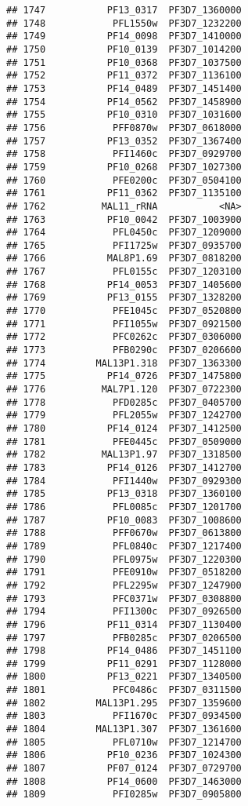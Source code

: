 \documentclass{article}\usepackage[]{graphicx}\usepackage[]{color}
\makeatletter
\newenvironment{kframe}{%
 \def\at@end@of@kframe{}%
 \ifinner\ifhmode%
  \def\at@end@of@kframe{\end{minipage}}%
  \begin{minipage}{\columnwidth}%
 \fi\fi%
 \def\FrameCommand##1{\hskip\@totalleftmargin \hskip-\fboxsep
 \colorbox{shadecolor}{##1}\hskip-\fboxsep
     \hskip-\linewidth \hskip-\@totalleftmargin \hskip\columnwidth}%
 \MakeFramed {\advance\hsize-\width
   \@totalleftmargin\z@ \linewidth\hsize
   \@setminipage}}%
 {\par\unskip\endMakeFramed%
 \at@end@of@kframe}
\newenvironment{knitrout}{}{} %
\makeatother
\begin{document}
\begin{knitrout}
\begin{kframe}
\begin{verbatim}
## 1747           PF13_0317  PF3D7_1360000
## 1748            PFL1550w  PF3D7_1232200
## 1749           PF14_0098  PF3D7_1410000
## 1750           PF10_0139  PF3D7_1014200
## 1751           PF10_0368  PF3D7_1037500
## 1752           PF11_0372  PF3D7_1136100
## 1753           PF14_0489  PF3D7_1451400
## 1754           PF14_0562  PF3D7_1458900
## 1755           PF10_0310  PF3D7_1031600
## 1756            PFF0870w  PF3D7_0618000
## 1757           PF13_0352  PF3D7_1367400
## 1758            PFI1460c  PF3D7_0929700
## 1759           PF10_0268  PF3D7_1027300
## 1760            PFE0200c  PF3D7_0504100
## 1761           PF11_0362  PF3D7_1135100
## 1762          MAL11_rRNA           <NA>
## 1763           PF10_0042  PF3D7_1003900
## 1764            PFL0450c  PF3D7_1209000
## 1765            PFI1725w  PF3D7_0935700
## 1766           MAL8P1.69  PF3D7_0818200
## 1767            PFL0155c  PF3D7_1203100
## 1768           PF14_0053  PF3D7_1405600
## 1769           PF13_0155  PF3D7_1328200
## 1770            PFE1045c  PF3D7_0520800
## 1771            PFI1055w  PF3D7_0921500
## 1772            PFC0262c  PF3D7_0306000
## 1773            PFB0290c  PF3D7_0206600
## 1774         MAL13P1.318  PF3D7_1363300
## 1775           PF14_0726  PF3D7_1475800
## 1776          MAL7P1.120  PF3D7_0722300
## 1778            PFD0285c  PF3D7_0405700
## 1779            PFL2055w  PF3D7_1242700
## 1780           PF14_0124  PF3D7_1412500
## 1781            PFE0445c  PF3D7_0509000
## 1782          MAL13P1.97  PF3D7_1318500
## 1783           PF14_0126  PF3D7_1412700
## 1784            PFI1440w  PF3D7_0929300
## 1785           PF13_0318  PF3D7_1360100
## 1786            PFL0085c  PF3D7_1201700
## 1787           PF10_0083  PF3D7_1008600
## 1788            PFF0670w  PF3D7_0613800
## 1789            PFL0840c  PF3D7_1217400
## 1790            PFL0975w  PF3D7_1220300
## 1791            PFE0910w  PF3D7_0518200
## 1792            PFL2295w  PF3D7_1247900
## 1793            PFC0371w  PF3D7_0308800
## 1794            PFI1300c  PF3D7_0926500
## 1796           PF11_0314  PF3D7_1130400
## 1797            PFB0285c  PF3D7_0206500
## 1798           PF14_0486  PF3D7_1451100
## 1799           PF11_0291  PF3D7_1128000
## 1800           PF13_0221  PF3D7_1340500
## 1801            PFC0486c  PF3D7_0311500
## 1802         MAL13P1.295  PF3D7_1359600
## 1803            PFI1670c  PF3D7_0934500
## 1804         MAL13P1.307  PF3D7_1361600
## 1805            PFL0710w  PF3D7_1214700
## 1806           PF10_0236  PF3D7_1024300
## 1807           PF07_0124  PF3D7_0729700
## 1808           PF14_0600  PF3D7_1463000
## 1809            PFI0285w  PF3D7_0905800

\end{verbatim}
\end{kframe}
\end{knitrout}
\end{document}
